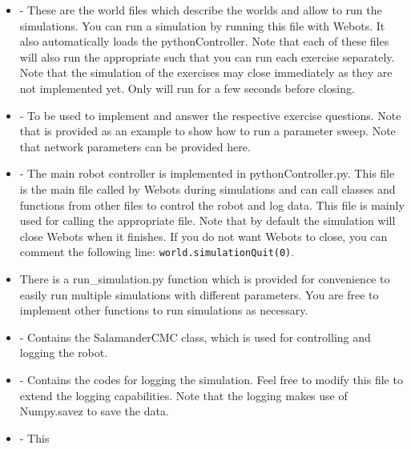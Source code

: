 \documentclass{cmc}
\begin{document}
\begin{itemize}
\item {} - These are the
  world files which describe the worlds and allow to run the simulations. You
  can run a simulation by running this file with Webots. It also automatically
  loads the pythonController. Note that each of these files will also run the
  appropriate  such that you can run each exercise
  separately. Note that the simulation of the exercises may close immediately as
  they are not implemented yet. Only  will
  run for a few seconds before closing.
\item {} -
  To be used to implement and answer the respective exercise questions. Note
  that  is provided as an example to show how to run
  a parameter sweep. Note that network parameters can be provided here.
\item {}
  - The main robot controller is implemented in pythonController.py. This file
  is the main file called by Webots during simulations and can call classes and
  functions from other files to control the robot and log data. This file is
  mainly used for calling the appropriate  file. Note that
  by default the simulation will close Webots when it finishes. If you do not
  want Webots to close, you can comment the following line:
  \texttt{world.simulationQuit(0)}.
\item {}
  There is a run\_simulation.py function which is provided for convenience
  to easily run multiple simulations with different parameters. You are free to
  implement other functions to run simulations as necessary.
\item {} -
  Contains the SalamanderCMC class, which is used for controlling and logging
  the robot.
\item
   -
  Contains the codes for logging the simulation. Feel free to modify this file
  to extend the logging capabilities. Note that the logging makes use of
  Numpy.savez to save the data.
\item {} - This

\end{itemize}
\end{document}
